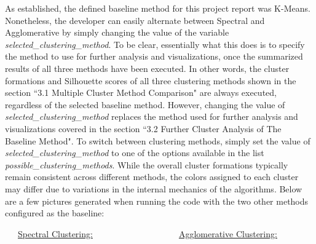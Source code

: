 \documentclass[11pt]{article}
\begin{document}
As established, the defined baseline method for this project report was K-Means. Nonetheless, the developer can easily alternate between Spectral and Agglomerative by simply changing the value of the variable \textit{selected\_clustering\_method}. To be clear, essentially what this does is to specify the method to use for further analysis and visualizations, once the summarized results of all three methods have been executed. In other words, the cluster formations and Silhouette scores of all three clustering methods shown in the section ``3.1 Multiple Cluster Method Comparison" are always executed, regardless of the selected baseline method. However, changing the value of \textit{selected\_clustering\_method} replaces the method used for further analysis and visualizations covered in the section ``3.2 Further Cluster Analysis of The Baseline Method". To switch between clustering methods, simply set the value of \textit{selected\_clustering\_method} to one of the options available in the list \textit{possible\_clustering\_methods}. While the overall cluster formations typically remain consistent across different methods, the colors assigned to each cluster may differ due to variations in the internal mechanics of the algorithms. Below are a few pictures generated when running the code with the two other methods configured as the baseline:

\vspace{1\baselineskip}
\ \ \ \uline{Spectral Clustering:}\ \ \ \ \ \ \ \ \ \ \ \ \ \ \ \ \ \ \ \ \uline{Agglomerative Clustering:}
\end{document}
